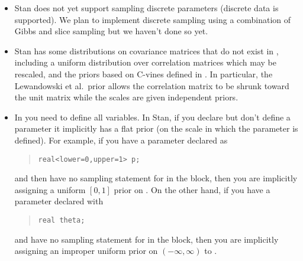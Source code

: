 \begin{itemize}
\item Stan does not yet support sampling discrete parameters (discrete
  data is supported).  We plan to implement discrete sampling using a
  combination of Gibbs and slice sampling but we haven't done so yet.
\item Stan has some distributions on covariance matrices that do not
  exist in \BUGS, including a uniform distribution over correlation
  matrices which may be rescaled, and the priors based on C-vines
  defined in \citep{LewandowskiKurowickaJoe:2009}.  In particular, the
  Lewandowski et al.\ prior allows the correlation matrix to be shrunk
  toward the unit matrix while the scales are given independent priors.
\item In \BUGS you need to define all variables.  In Stan, if you
  declare but don't define a parameter it implicitly has a flat prior
  (on the scale in which the parameter is defined).  For example, if
  you have a parameter  declared as 
\begin{quote}
\begin{Verbatim}[fontsize=\small]
real<lower=0,upper=1> p;
\end{Verbatim}
\end{quote}
%
and then have no sampling statement for  in the 
block, then you are implicitly assigning a uniform $[0,1]$ prior on
.
On the other hand, if you have a parameter  declared with
%
\begin{quote}
\begin{Verbatim}[fontsize=\small]
real theta;
\end{Verbatim}
\end{quote}
%
and have no sampling statement for  in the
 block, 
 then you are implicitly assigning an improper uniform prior
on $(-\infty,\infty)$ to .  
%

\end{itemize}
